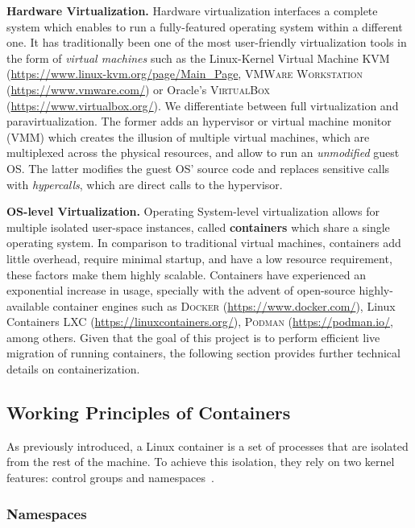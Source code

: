 \textbf{Hardware Virtualization.}
Hardware virtualization interfaces a complete system which enables to run a fully-featured operating system within a different one.
It has traditionally been one of the most user-friendly virtualization tools in the form of \emph{virtual machines} such as the Linux-Kernel Virtual Machine \textsc{KVM} (\url{https://www.linux-kvm.org/page/Main_Page}, \textsc{VMWare Workstation} (\url{https://www.vmware.com/}) or Oracle's \textsc{VirtualBox} (\url{https://www.virtualbox.org/}).
We differentiate between full virtualization and paravirtualization.
The former adds an hypervisor or virtual machine monitor (VMM) which creates the illusion of multiple virtual machines, which are multiplexed across the physical resources, and allow to run an \emph{unmodified} guest OS.
The latter modifies the guest OS' source code and replaces sensitive calls with \emph{hypercalls}, which are direct calls to the hypervisor.

\textbf{OS-level Virtualization.}
Operating System-level virtualization allows for multiple isolated user-space instances, called \textbf{containers} which share a single operating system.
In comparison to traditional virtual machines, containers add little overhead, require minimal startup, and have a low resource requirement, these factors make them highly scalable.
Containers have experienced an exponential increase in usage, specially with the advent of open-source highly-available container engines such as \textsc{Docker} (\url{https://www.docker.com/}), Linux Containers \textsc{LXC} (\url{https://linuxcontainers.org/}), \textsc{Podman} (\url{https://podman.io/}, among others.
Given that the goal of this project is to perform efficient live migration of running containers, the following section provides further technical details on containerization.

\subsection{Working Principles of Containers}

As previously introduced, a Linux container is a set of processes that are isolated from the rest of the machine.
To achieve this isolation, they rely on two kernel features: control groups and namespaces~\cite{namespaces-manual}.

\subsubsection*{Namespaces}

